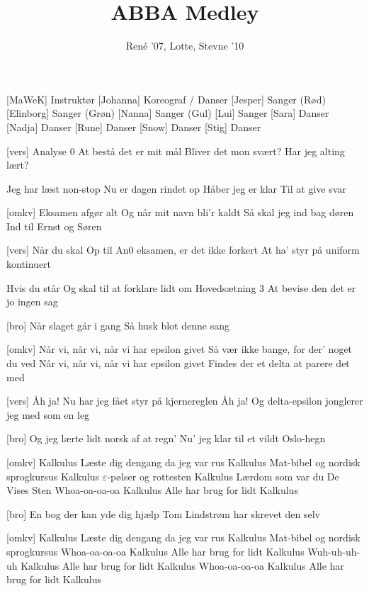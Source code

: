 \documentclass[a4paper,11pt]{article}
\title{ABBA Medley}
\author{René '07, Lotte, Stevne '10}
\begin{document}
\maketitle

\begin{roles}
[MaWeK] Instruktør
[Johanna] Koreograf / Danser
[Jesper] Sanger (Rød)
[Elinborg] Sanger (Grøn)
[Nanna] Sanger (Gul)
[Lui] Sanger
[Sara] Danser
[Nadja] Danser
[Rune] Danser
[Snow] Danser
[Stig] Danser
\end{roles}

\begin{song}

[vers]%
Analyse 0
At bestå det er mit mål
Bliver det mon svært?
Har jeg alting lært?

Jeg har læst non-stop
Nu er dagen rindet op
Håber jeg er klar
Til at give svar

[omkv]%
Eksamen afgør alt
Og når mit navn bli'r kaldt
Så skal jeg ind bag døren
Ind til Ernst og Søren


[vers]%
Når du skal
%
Op til An0 eksamen, er det ikke forkert
At ha' styr på uniform kontinuert 

% 
Hvis du står
%
Og skal til at forklare lidt om Hovedsætning 3
At bevise den det er jo ingen sag

[bro]%
Når slaget går i gang
Så husk blot denne sang

[omkv]%
Når vi, når vi, når vi har epsilon givet
Så vær ikke bange, for der' noget du ved
Når vi, når vi, når vi har epsilon givet
Findes der et delta at parere det med


[vers]%
Åh ja!
Nu har jeg fået styr på kjernereglen
Åh ja!
Og delta-epsilon jonglerer jeg med som en leg

[bro]%
Og jeg lærte lidt norsk af at regn'
Nu' jeg klar til et vildt Oslo-hegn

[omkv]%
Kalkulus
Læste dig dengang da jeg var rus
Kalkulus
Mat-bibel og nordisk sprogkursus
Kalkulus
$\varepsilon$-pølser og rottesten
Kalkulus
Lærdom som var du De Vises Sten
Whoa-oa-oa-oa
Kalkulus
Alle har brug for lidt Kalkulus

[bro]%
En bog der kan yde dig hjælp
Tom Lindstrøm har skrevet den selv

[omkv]%
Kalkulus
Læste dig dengang da jeg var rus
Kalkulus
Mat-bibel og nordisk sprogkursus
Whoa-oa-oa-oa
Kalkulus
Alle har brug for lidt Kalkulus
Wuh-uh-uh-uh
Kalkulus
Alle har brug for lidt Kalkulus
Whoa-oa-oa-oa
Kalkulus
Alle har brug for lidt Kalkulus
\end{song}
\end{document}
